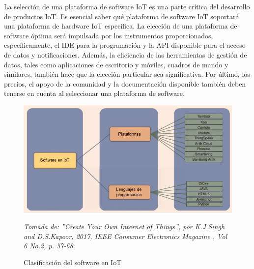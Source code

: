 La selección de una plataforma de software IoT es una parte crítica del desarrollo de productos IoT. Es esencial saber qué plataforma de software IoT soportará una plataforma de hardware IoT específica. La elección de una plataforma de software óptima será impulsada por los instrumentos proporcionados, específicamente, el IDE para la programación y la API disponible para el acceso de datos y notificaciones.
Además, la eficiencia de las herramientas de gestión de datos, tales como aplicaciones de escritorio y móviles, cuadros de mando y similares, también hace que la elección particular sea significativa. Por último, los precios, el apoyo de la comunidad y la documentación disponible también deben tenerse en cuenta al seleccionar una plataforma de software.\cite{7879392}

\nocite{7925808}
\nocite{7842386}
\nocite{esp32}
\nocite{omega}
\nocite{raspberry}
\nocite{molano}
\nocite{Cha}
\nocite{thingspeak}
\nocite{initial}
\nocite{ubidots}


\begin{figure}[ht!]
\begin{centering}
\includegraphics [trim = 0mm 0mm 0mm 0mm, clip,angle=0,scale=0.55]{Images/software}%
\caption{\label{fig:Software}Clasificación del software en IoT} \textit{Tomada de: ''Create Your Own Internet of Things'', por K.J.Singh and D.S.Kapoor, 2017, IEEE Consumer Electronics Magazine , Vol 6 No.2, p. 57-68.}
\par\end{centering}
\end{figure}
